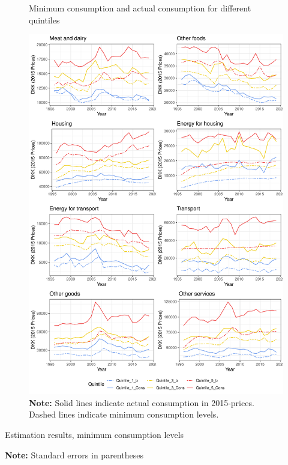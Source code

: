 \begin{figure}[H]
\centering
\caption{Minimum consumption and actual consumption for different quintiles}
\label{fig:mincons}
\includegraphics[width=.9\textwidth]{Figures/b_quintileplot.pdf}
\captionsetup{singlelinecheck=off,size=scriptsize}
\setlength{\captionmargin}{10pt}
\caption*{
\textbf{Note:} Solid lines indicate actual consumption in 2015-prices. Dashed lines indicate minimum consumption levels.\\}
\end{figure}

\begin{table}[H]
\centering
\renewcommand{\arraystretch}{0.7}
\caption{Estimation results, minimum consumption levels}
\label{mdl7estpart}

\captionsetup{singlelinecheck=off,size=scriptsize}
\setlength{\captionmargin}{10pt}
\caption*{
\textbf{Note:} Standard errors in parentheses}
\end{table}


